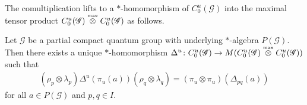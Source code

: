 The comultiplication  lifts to a $*$-homomorphism  of
$C^{u}_{0}(\mathscr{G})$ into the maximal tensor product
$C^{u}_{0}(\mathscr{G}) \stackrel{\text{\tiny max}}{\otimes}
C^{u}_{0}(\mathscr{G})$ as follows.


\begin{Prop}
Let $\mathscr{G}$ be a partial compact quantum group with underlying
$*$-algebra $P(\mathscr{G})$. Then  there exists a unique $*$-homomorphism $\Delta^{u}\colon
  C^{u}_{0}(\mathscr{G}) \to M(C^{u}_{0}(\mathscr{G}) \stackrel{\text{\tiny max}}{\otimes}
  C^{u}_{0}(\mathscr{G}))$ such that 
  \begin{align*}
    (\rho_{p} \otimes
    \lambda_{p})\Delta^{u}(\pi_{u}(a))(\rho_{q}\otimes \lambda_{q}) =
    (\pi_{u}  \otimes \pi_{u})(\Delta_{pq}(a))
  \end{align*}
  for all $a \in P(\mathscr{G})$ and $p,q\in I$.
\end{Prop}
